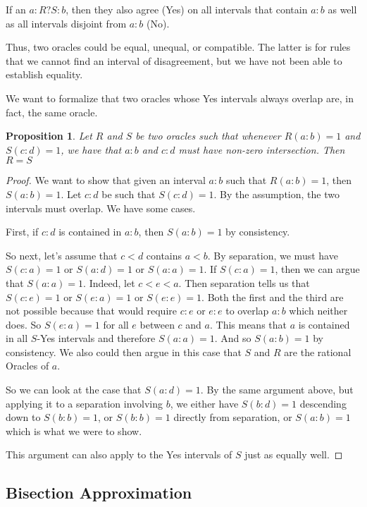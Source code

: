 \documentclass[12pt]{article}
\newtheorem{proposition}{Proposition}
\theoremstyle{remark}
\begin{document}
If an $a:R?S:b$, then they also agree (Yes) on all intervals that contain $a:b$ as well as all intervals disjoint from $a:b$ (No). 

Thus, two oracles could be equal, unequal, or compatible. The latter is for rules that we cannot find an interval of disagreement, but we have not been able to establish equality. 

We want to formalize that two oracles whose Yes intervals always overlap are, in fact, the same oracle.

\begin{proposition}\label{pr:overlap}
Let $R$ and $S$ be two oracles such that whenever $R(a:b)=1$ and $S(c:d)=1$, we have that $a:b$ and $c:d$ must have non-zero intersection. Then $R =S$
\end{proposition}

\begin{proof}
We want to show that given an interval $a:b$ such that $R(a:b)=1$, then $S(a:b)=1$. Let $c:d$ be such that $S(c:d)=1$. By the assumption, the two intervals must overlap. We have some cases. 

First, if $c:d$ is contained in $a:b$, then $S(a:b)=1$ by consistency. 

So next, let's assume that $c<d$ contains $a<b$. By separation, we must have $S(c:a) =1$ or $S(a:d) = 1$ or $S(a:a) =1$. If $S(c:a) = 1$, then we can argue that $S(a:a) =1$. Indeed, let $c < e < a$. Then separation tells us that $S(c:e) = 1$ or $S(e:a)  = 1$ or $S(e:e)=1$. Both the first and the third are not possible because that would require $c:e$ or $e:e$ to overlap $a:b$ which neither does. So $S(e:a) = 1$ for all $e$ between $c$ and $a$. This means that $a$ is contained in all $S$-Yes intervals and therefore $S(a:a)=1$. And so $S(a:b)=1$ by consistency. We also could then argue in this case that $S$ and $R$ are the rational Oracles of $a$. 

So we can look at the case that $S(a:d) = 1$. By the same argument above, but applying it to a separation involving $b$, we either have $S(b:d)=1$ descending down to $S(b:b)=1$, or $S(b:b)=1$ directly from separation, or $S(a:b)=1$ which is what we were to show. 

This argument can also apply to the Yes intervals of $S$ just as equally well. 
\end{proof}

\subsection{Bisection Approximation}
\end{document}
